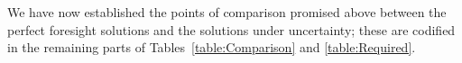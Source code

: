 \documentclass[BufferStockTheory]{subfiles}
\begin{document}
We have now established the points of comparison promised above between the perfect foresight solutions and the solutions under uncertainty; these are codified in the remaining parts of Tables~\ref{table:Comparison} and \ref{table:Required}.

\hypertarget{Factors-Defined-And-Compared}{}


\hypertarget{Sufficient-Conditions}{}
\hypertarget{Sufficient-Conditions-For-Nondegenerate-Solution}{}


\begin{comment}
  To help interpret our condition, consider an infinite horizon perfect
  foresight consumer who does satisfy $\PGro < \Rfree$ and who arrives in period
  $t$ with beginning-of-period resources of zero, so that he has only
  human wealth.  If initial permanent income is $\pLevBF_{t}$ then
  $\hLevBF_{t}=\pLevBF_{t}(\Rfree/(\Rfree-\PGro))$ and the formula for consumption \eqref{eq:WDef} becomes
  \begin{align}
    \cLevBF_{t}  & = \left(\frac{\Rfree - {\Pat}}{\Rfree-\PGro}\right)\pLevBF_{t}
  \end{align}
  so the condition ${\Pat} < \PGro$ guarantees that consumption
  will exceed noncapital income of $\pLevBF_{t}$.  Thus, this consumer is `impatient'
  in the sense of wanting to borrow against future noncapital income to finance
  current consumption (this justifies our labeling of \eqref{eq:GIC} as the
  `growth impatience condition.')

  The presence of permanent shocks tightens the restriction, since if
  $\pShk$ is nondegenerate then $\Ex[\pShk^{-\CRRA}]^{-1/\CRRA} > 1$.  The
  interpretation of this effect is simple: The presence of uncertainty
  in permanent income increases the consumer's precautionary saving
  motive, and therefore increases the degree of patience; the condition
  requires that even after this boost to the saving motive, the consumer
  remains impatient in the relevant sense.

  The simplest intuition for why our model has a solution when $\PGro>\Rfree$
  comes from the essential equivalence between the precautionary saving
  motive and liquidity constraints. Consider a version of the perfect
  foresight model with liquidity constraints.  This model {\it does}
  have a well defined solution for $\PGro>\Rfree$ because even a consumer with
  considerable current resources cannot spend an infinite amount (even
  if the PDV of future noncapital income is infinite) because that would
  violate the constraint.  Furthermore, the amount the consumer is
  willing to spend today is limited by the knowledge that, because of
  impatience, they will be constrained at some point in the future.


\end{comment}
\end{document}
